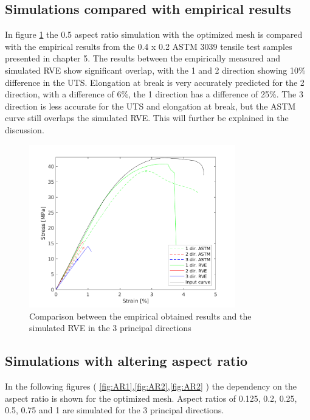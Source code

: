 \subsection{Simulations compared with empirical results }
In figure \ref{fig:ComparisonSS} the 0.5 aspect ratio simulation with the optimized mesh is compared with the empirical results from the 0.4 x 0.2 ASTM 3039 tensile test samples presented in chapter 5. The results between the empirically measured and simulated RVE show significant overlap, with the 1 and 2 direction showing 10\% difference in the UTS. Elongation at break is very accurately predicted for the 2 direction, with a difference of 6\%, the 1 direction has a difference of 25\%. The 3 direction is less accurate for the UTS and elongation at break, but the ASTM curve still overlaps the simulated RVE. This will further be explained in the discussion.

\begin{figure}[htb]
    \centering
    \includegraphics[width=0.80\textwidth]{chapter_7_non-elasticmodelling/figures/ComparisonSS.png}
    \caption{Comparison between the empirical obtained results and the simulated RVE in the 3 principal directions}
    \label{fig:ComparisonSS}
\end{figure}

\subsection{Simulations with altering aspect ratio}
In the following figures ( \ref{fig:AR1},\ref{fig:AR2},\ref{fig:AR2} ) the dependency on the aspect ratio is shown for the optimized mesh. Aspect ratios of 0.125, 0.2, 0.25, 0.5, 0.75 and 1 are simulated for the 3 principal directions. 

